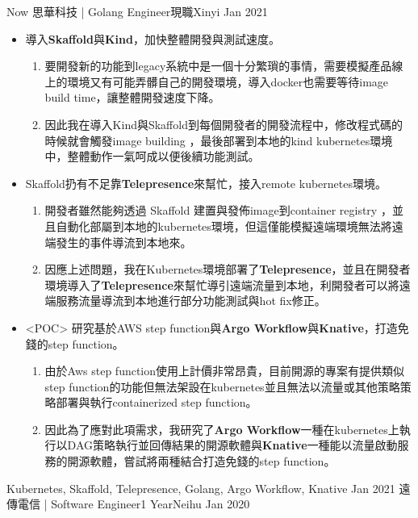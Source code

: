 \begin{experiences}
	\experience
	{Now}   {思華科技 | Golang Engineer}{現職}{Xinyi}
	{Jan 2021} {
		\begin{itemize}
			\item 導入\textbf{Skaffold}與\textbf{Kind}，加快整體開發與測試速度。
			\begin{enumerate}                      	
				\item 要開發新的功能到legacy系統中是一個十分繁瑣的事情，需要模擬產品線上的環境又有可能弄髒自己的開發環境，導入docker也需要等待image build time，讓整體開發速度下降。
				\item 因此我在導入Kind與Skaffold到每個開發者的開發流程中，修改程式碼的時候就會觸發image building ，最後部署到本地的kind  kubernetes環境中，整體動作一氣呵成以便後續功能測試。
			\end{enumerate}
			\item Skaffold扔有不足靠\textbf{Telepresence}來幫忙，接入remote kubernetes環境。
			\begin{enumerate}
				\item 開發者雖然能夠透過 Skaffold 建置與發佈image到container registry ，並且自動化部屬到本地的kubernetes環境，但這僅能模擬遠端環境無法將遠端發生的事件導流到本地來。
				\item 因應上述問題，我在Kubernetes環境部署了\textbf{Telepresence}，並且在開發者環境導入了\textbf{Telepresence}來幫忙導引遠端流量到本地，利開發者可以將遠端服務流量導流到本地進行部分功能測試與hot fix修正。
			\end{enumerate}
			\item <POC> 研究基於AWS step function與\textbf{Argo Workflow}與\textbf{Knative}，打造免錢的step function。
			\begin{enumerate}                      	
				\item 由於Aws step function使用上計價非常昂貴，目前開源的專案有提供類似step function的功能但無法架設在kubernetes並且無法以流量或其他策略策略部署與執行containerized step function。
				\item 因此為了應對此項需求，我研究了\textbf{Argo Workflow}一種在kubernetes上執行以DAG策略執行並回傳結果的開源軟體與\textbf{Knative}一種能以流量啟動服務的開源軟體，嘗試將兩種結合打造免錢的step function。
			\end{enumerate}
		\end{itemize}
	}
	{Kubernetes, Skaffold, Telepresence, Golang, Argo Workflow, Knative}
	\emptySeparator
  \experience
    {Jan 2021}   {遠傳電信 | Software Engineer}{1 Year}{Neihu}
    {Jan 2020} {
                      \begin{itemize}

\end{itemize}}
\end{experiences}

